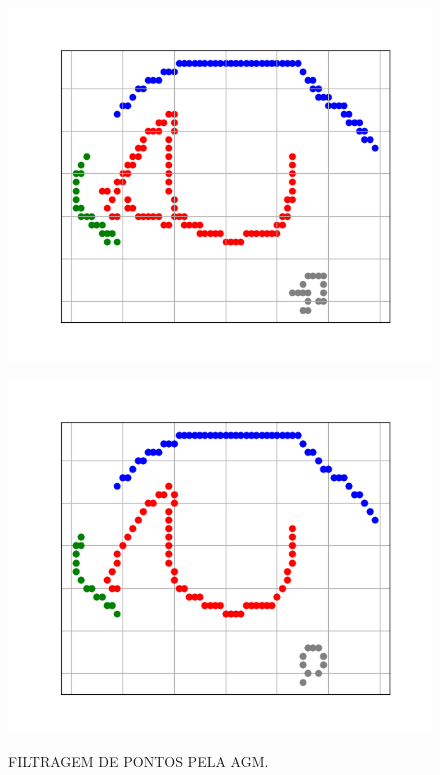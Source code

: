 \begin{figure}[h!]
    \caption{FILTRAGEM DE PONTOS PELA AGM.}
    \centering
    \begin{minipage}[b]{0.45\textwidth}
        \centering
        \includegraphics[width=0.9\linewidth]{fig/04_connected_components_right_eye.png}
        \label{fig:olho-grafo}
    \end{minipage}
    \hfill
    \begin{minipage}[b]{0.45\textwidth}
        \centering
        \includegraphics[width=0.9\linewidth]{fig/05_longest_path_right_eye.png}
        \label{fig:olho-agm}
    \end{minipage}


\end{figure}
